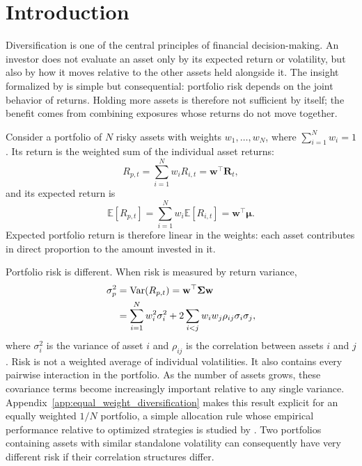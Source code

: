 
\section{Introduction}
\label{sec:introduction}

Diversification is one of the central principles of financial decision-making. An investor does not evaluate an asset only by its expected return or volatility, but also by how it moves relative to the other assets held alongside it. The insight formalized by \citet{markowitz1952portfolio} is simple but consequential: portfolio risk depends on the joint behavior of returns. Holding more assets is therefore not sufficient by itself; the benefit comes from combining exposures whose returns do not move together.

Consider a portfolio of \(N\) risky assets with weights \(w_1,\ldots,w_N\), where \(\sum_{i=1}^{N} w_i=1\). Its return is the weighted sum of the individual asset returns:
\begin{equation}
R_{p,t}=\sum_{i=1}^{N}w_iR_{i,t}=\mathbf{w}^{\top}\mathbf{R}_t,
\label{eq:portfolio_return}
\end{equation}
and its expected return is
\begin{equation}
\mathbb{E}[R_{p,t}]
=\sum_{i=1}^{N}w_i\mathbb{E}[R_{i,t}]
=\mathbf{w}^{\top}\boldsymbol{\mu}.
\label{eq:portfolio_expected_return}
\end{equation}
Expected portfolio return is therefore linear in the weights: each asset contributes in direct proportion to the amount invested in it.

Portfolio risk is different. When risk is measured by return variance,
\begin{align}
\sigma_p^2
&=\operatorname{Var}(R_{p,t})
=\mathbf{w}^{\top}\boldsymbol{\Sigma}\mathbf{w} \notag\\
&=\sum_{i=1}^{N}w_i^2\sigma_i^2
+2\sum_{i<j}w_iw_j\rho_{ij}\sigma_i\sigma_j,
\label{eq:portfolio_variance}
\end{align}
where \(\sigma_i^2\) is the variance of asset \(i\) and \(\rho_{ij}\) is the correlation between assets \(i\) and \(j\). Risk is not a weighted average of individual volatilities. It also contains every pairwise interaction in the portfolio. As the number of assets grows, these covariance terms become increasingly important relative to any single variance. Appendix~\ref{app:equal_weight_diversification} makes this result explicit for an equally weighted \(1/N\) portfolio, a simple allocation rule whose empirical performance relative to optimized strategies is studied by \citet{demiguel2009optimal}. Two portfolios containing assets with similar standalone volatility can consequently have very different risk if their correlation structures differ.


